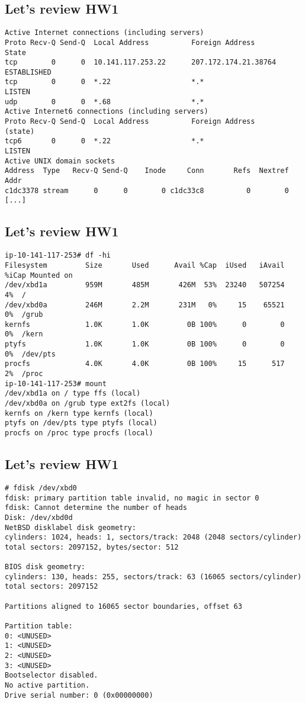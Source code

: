 \documentclass[xga]{xdvislides}
\begin{document}
\subsection{Let's review HW1}
\begin{verbatim}
Active Internet connections (including servers)
Proto Recv-Q Send-Q  Local Address          Foreign Address        State
tcp        0      0  10.141.117.253.22      207.172.174.21.38764   ESTABLISHED
tcp        0      0  *.22                   *.*                    LISTEN
udp        0      0  *.68                   *.*                   
Active Internet6 connections (including servers)
Proto Recv-Q Send-Q  Local Address          Foreign Address        (state)
tcp6       0      0  *.22                   *.*                    LISTEN
Active UNIX domain sockets
Address  Type   Recv-Q Send-Q    Inode     Conn       Refs  Nextref Addr
c1dc3378 stream      0      0        0 c1dc33c8          0        0 
[...]
\end{verbatim}

\subsection{Let's review HW1}
\begin{verbatim}
ip-10-141-117-253# df -hi
Filesystem         Size       Used      Avail %Cap  iUsed   iAvail %iCap Mounted on
/dev/xbd1a         959M       485M       426M  53%  23240   507254   4%  /
/dev/xbd0a         246M       2.2M       231M   0%     15    65521   0%  /grub
kernfs             1.0K       1.0K         0B 100%      0        0   0%  /kern
ptyfs              1.0K       1.0K         0B 100%      0        0   0%  /dev/pts
procfs             4.0K       4.0K         0B 100%     15      517   2%  /proc
ip-10-141-117-253# mount
/dev/xbd1a on / type ffs (local)
/dev/xbd0a on /grub type ext2fs (local)
kernfs on /kern type kernfs (local)
ptyfs on /dev/pts type ptyfs (local)
procfs on /proc type procfs (local)
\end{verbatim}


\subsection{Let's review HW1}
\small
\begin{verbatim}
# fdisk /dev/xbd0
fdisk: primary partition table invalid, no magic in sector 0
fdisk: Cannot determine the number of heads
Disk: /dev/xbd0d
NetBSD disklabel disk geometry:
cylinders: 1024, heads: 1, sectors/track: 2048 (2048 sectors/cylinder)
total sectors: 2097152, bytes/sector: 512

BIOS disk geometry:
cylinders: 130, heads: 255, sectors/track: 63 (16065 sectors/cylinder)
total sectors: 2097152

Partitions aligned to 16065 sector boundaries, offset 63

Partition table:
0: <UNUSED>
1: <UNUSED>
2: <UNUSED>
3: <UNUSED>
Bootselector disabled.
No active partition.
Drive serial number: 0 (0x00000000)
\end{verbatim}
\Normalsize
\end{document}
